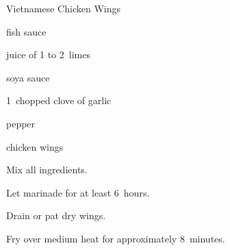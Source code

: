 \begin{recipe}{Vietnamese Chicken Wings}{}{}

\begin{ingredients}
\item {} fish sauce
\item juice of 1 to 2~limes
\item {} soya sauce
\item 1~chopped clove of garlic
\item pepper
\item chicken wings
\end{ingredients}

\begin{directions}
\item Mix all ingredients.
\item Let marinade for at least 6~hours.
\item Drain or pat dry wings.
\item Fry over medium heat for approximately 8~minutes.
\end{directions}

\end{recipe}
